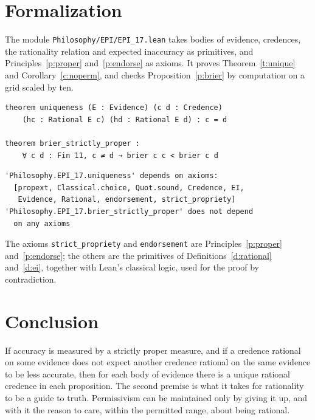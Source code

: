 \documentclass{situationist-preprint}
\begin{document}
\section{Formalization}

The module \nolinkurl{Philosophy/EPI/EPI_17.lean} takes bodies of evidence, credences, the rationality relation and expected inaccuracy as primitives, and Principles~\ref{p:proper} and~\ref{p:endorse} as axioms. It proves Theorem~\ref{t:unique} and Corollary~\ref{c:noperm}, and checks Proposition~\ref{p:brier} by computation on a grid scaled by ten.

\begin{lstlisting}
theorem uniqueness (E : Evidence) (c d : Credence)
    (hc : Rational E c) (hd : Rational E d) : c = d

theorem brier_strictly_proper :
    ∀ c d : Fin 11, c ≠ d → brier c c < brier c d
\end{lstlisting}

\begin{lstlisting}
'Philosophy.EPI_17.uniqueness' depends on axioms:
  [propext, Classical.choice, Quot.sound, Credence, EI,
   Evidence, Rational, endorsement, strict_propriety]
'Philosophy.EPI_17.brier_strictly_proper' does not depend
  on any axioms
\end{lstlisting}

The axioms \texttt{strict\_propriety} and \texttt{endorsement} are Principles~\ref{p:proper} and~\ref{p:endorse}; the others are the primitives of Definitions~\ref{d:rational} and~\ref{d:ei}, together with Lean's classical logic, used for the proof by contradiction.

\section{Conclusion}

If accuracy is measured by a strictly proper measure, and if a credence rational on some evidence does not expect another credence rational on the same evidence to be less accurate, then for each body of evidence there is a unique rational credence in each proposition. The second premise is what it takes for rationality to be a guide to truth. Permissivism can be maintained only by giving it up, and with it the reason to care, within the permitted range, about being rational.
\end{document}
